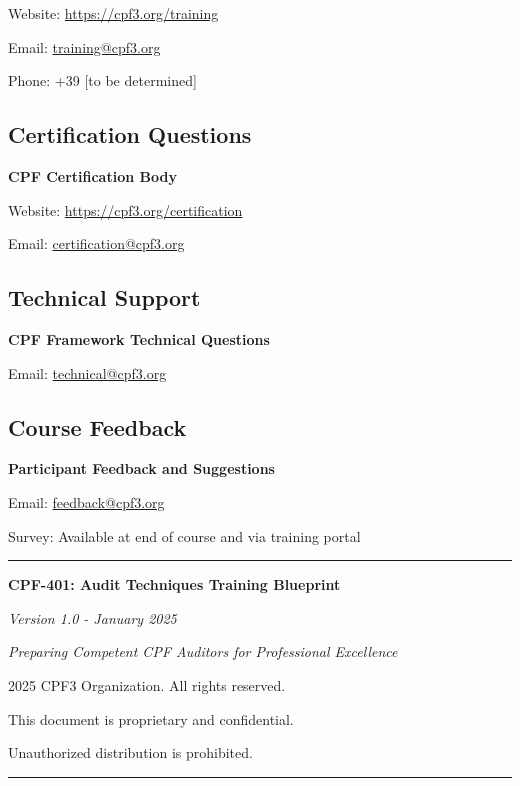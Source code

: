 \documentclass[11pt,a4paper]{article}
\begin{document}
Website: \url{https://cpf3.org/training}

Email: \href{mailto:training@cpf3.org}{training@cpf3.org}

Phone: +39 [to be determined]

\subsection{Certification Questions}

\textbf{CPF Certification Body}

Website: \url{https://cpf3.org/certification}

Email: \href{mailto:certification@cpf3.org}{certification@cpf3.org}

\subsection{Technical Support}

\textbf{CPF Framework Technical Questions}

Email: \href{mailto:technical@cpf3.org}{technical@cpf3.org}

\subsection{Course Feedback}

\textbf{Participant Feedback and Suggestions}

Email: \href{mailto:feedback@cpf3.org}{feedback@cpf3.org}

Survey: Available at end of course and via training portal

\vspace{2em}

\begin{center}
\rule{\textwidth}{0.4pt}

\vspace{1em}

\textbf{CPF-401: Audit Techniques Training Blueprint}

\textit{Version 1.0 - January 2025}

\vspace{0.5em}

\textit{Preparing Competent CPF Auditors for Professional Excellence}

\vspace{1em}

\textcopyright{} 2025 CPF3 Organization. All rights reserved.

\vspace{0.5em}

This document is proprietary and confidential.

Unauthorized distribution is prohibited.

\vspace{2em}

\rule{\textwidth}{0.4pt}
\end{center}
\end{document}
